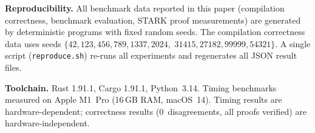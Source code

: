 \documentclass[11pt]{article}
\begin{document}
\bigskip
\noindent\textbf{Reproducibility.}
All benchmark data reported in this paper (compilation correctness,
benchmark evaluation, STARK proof measurements) are generated by
deterministic programs with fixed random seeds.  The compilation
correctness data uses seeds $\{42, 123, 456, 789, 1337, 2024,$
$31415, 27182, 99999, 54321\}$.
A single script (\texttt{reproduce.sh}) re-runs all experiments
and regenerates all JSON result files.

\smallskip\noindent\textbf{Toolchain.}
Rust 1.91.1, Cargo 1.91.1, Python~3.14.
Timing benchmarks measured on Apple M1~Pro (16\,GB RAM, macOS~14).
Timing results are hardware-dependent; correctness results
(0~disagreements, all proofs verified) are hardware-independent.


\end{document}
